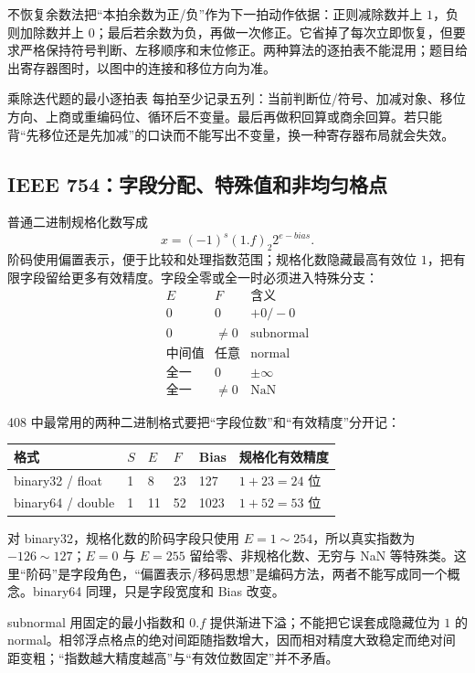 \documentclass[UTF8,fontset=fandol,11pt,a4paper]{ctexart}
\begin{document}
不恢复余数法把“本拍余数为正/负”作为下一拍动作依据：正则减除数并上 $1$，负则加除数并上 $0$；最后若余数为负，再做一次修正。它省掉了每次立即恢复，但要求严格保持符号判断、左移顺序和末位修正。两种算法的逐拍表不能混用；题目给出寄存器图时，以图中的连接和移位方向为准。

\begin{methodbox}{乘除迭代题的最小逐拍表}
每拍至少记录五列：当前判断位/符号、加减对象、移位方向、上商或重编码位、循环后不变量。最后再做积回算或商余回算。若只能背“先移位还是先加减”的口诀而不能写出不变量，换一种寄存器布局就会失效。
\end{methodbox}

\subsection{IEEE 754：字段分配、特殊值和非均匀格点}

普通二进制规格化数写成
\[
x=(-1)^s(1.f)_2 2^{e-bias}.
\]
阶码使用偏置表示，便于比较和处理指数范围；规格化数隐藏最高有效位 $1$，把有限字段留给更多有效精度。字段全零或全一时必须进入特殊分支：
\[
\begin{array}{c|c|c}
E & F & \text{含义}\\\hline
0&0&+0/-0\\
0&\ne0&\text{subnormal}\\
\text{中间值}&\text{任意}&\text{normal}\\
\text{全一}&0&\pm\infty\\
\text{全一}&\ne0&\text{NaN}
\end{array}
\]

408 中最常用的两种二进制格式要把“字段位数”和“有效精度”分开记：
\begin{center}\small
\begin{tabularx}{\linewidth}{L{1.8cm}C{1.1cm}C{1.1cm}C{1.1cm}C{1.4cm}Y}
\toprule
格式 & $S$ & $E$ & $F$ & Bias & 规格化有效精度 \\
\midrule
binary32 / float & 1 & 8 & 23 & 127 & $1+23=24$ 位 \\
binary64 / double & 1 & 11 & 52 & 1023 & $1+52=53$ 位 \\
\bottomrule
\end{tabularx}
\end{center}
对 binary32，规格化数的阶码字段只使用 $E=1\sim254$，所以真实指数为 $-126\sim127$；$E=0$ 与 $E=255$ 留给零、非规格化数、无穷与 NaN 等特殊类。这里“阶码”是字段角色，“偏置表示/移码思想”是编码方法，两者不能写成同一个概念。binary64 同理，只是字段宽度和 Bias 改变。

subnormal 用固定的最小指数和 $0.f$ 提供渐进下溢；不能把它误套成隐藏位为 $1$ 的 normal。相邻浮点格点的绝对间距随指数增大，因而相对精度大致稳定而绝对间距变粗；“指数越大精度越高”与“有效位数固定”并不矛盾。
\end{document}
